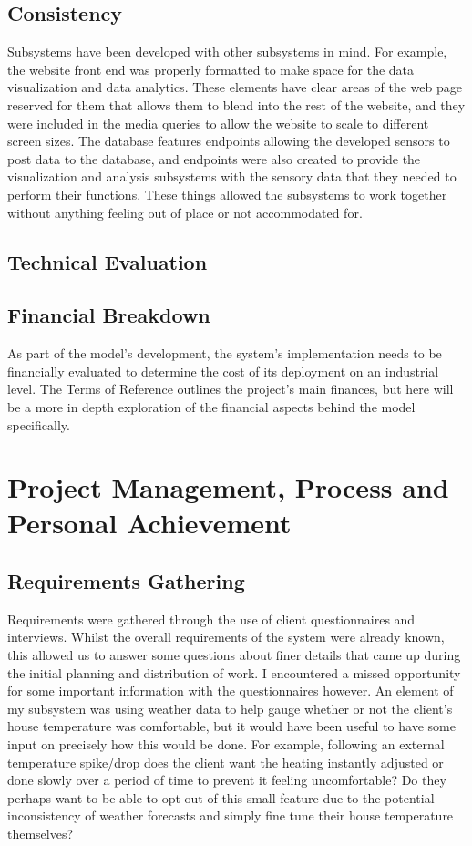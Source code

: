 \documentclass[]{report}
\begin{document}
	\subsection{Consistency}
	Subsystems have been developed with other subsystems in mind. For example, the website front end was properly formatted to make space for the data visualization and data analytics. These elements have clear areas of the web page reserved for them that allows them to blend into the rest of the website, and they were included in the media queries to allow the website to scale to different screen sizes. The database features endpoints allowing the developed sensors to post data to the database, and endpoints were also created to provide the visualization and analysis subsystems with the sensory data that they needed to perform their functions. These things allowed the subsystems to work together without anything feeling out of place or not accommodated for.
	
	\subsection{Technical Evaluation}
	
	
	\subsection{Financial Breakdown}
	As part of the model's development, the system's implementation needs to be financially evaluated to determine the cost of its deployment on an industrial level. The Terms of Reference outlines the project's main finances, but here will be a more in depth exploration of the financial aspects behind the model specifically.


\section{Project Management, Process and Personal Achievement}
\subsection{Requirements Gathering}
Requirements were gathered through the use of client questionnaires and interviews. Whilst the overall requirements of the system were already known, this allowed us to answer some questions about finer details that came up during the initial planning and distribution of work. I encountered a missed opportunity for some important information with the questionnaires however. An element of my subsystem was using weather data to help gauge whether or not the client's house temperature was comfortable, but it would have been useful to have some input on precisely how this would be done. For example, following an external temperature spike/drop does the client want the heating instantly adjusted or done slowly over a period of time to prevent it feeling uncomfortable? Do they perhaps want to be able to opt out of this small feature due to the potential inconsistency of weather forecasts and simply fine tune their house temperature themselves?
\end{document}
